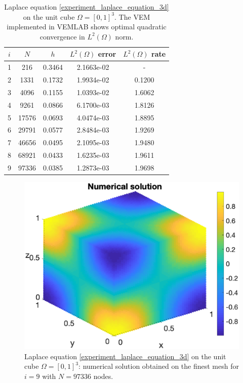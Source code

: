 \documentclass[a4paper]{article}
\begin{document}
\begin{table}[H]
\caption{Laplace equation \eqref{experiment_laplace_equation_3d} on the unit cube $\Omega = [0,1]^3$. The VEM implemented in VEMLAB shows optimal quadratic convergence in $L^2(\Omega)$ norm.}
\begin{center}
\begin{tabular}{c | c | c | c | c}
$i$ & $N$ & $h$ & $L^2(\Omega)$ error & $L^2(\Omega)$ rate\\
\hline
1 & 216 & 0.3464 &   2.1663e-02 &     -\\
2 & 1331 & 0.1732 & 1.9934e-02 & 0.1200    \\
3 & 4096 & 0.1155 & 1.0393e-02 & 1.6062    \\
4 & 9261 & 0.0866 &  6.1700e-03 & 1.8126    \\
5 &  17576 &  0.0693 & 4.0474e-03 & 1.8895    \\
6 & 29791  & 0.0577 & 2.8484e-03 & 1.9269    \\
7 &  46656 & 0.0495 & 2.1095e-03 & 1.9480    \\
8 & 68921 & 0.0433 & 1.6235e-03  & 1.9611   \\
9 & 97336 & 0.0385 &  1.2873e-03 &  1.9698
\end{tabular}
\end{center}
\label{tab:laplace_3d_convergence}
\end{table}

\begin{figure}[H]
\begin{center}
\includegraphics[scale=0.5]{laplace3dcube_numsol_Nx46.eps}
\end{center}
\caption{Laplace equation \eqref{experiment_laplace_equation_3d} on the unit cube $\Omega = [0,1]^3$: numerical solution obtained on the finest mesh for $i=9$ with $N= 97336$ nodes.}
\label{fig:laplace_3d_numsol}
\end{figure}
\end{document}
